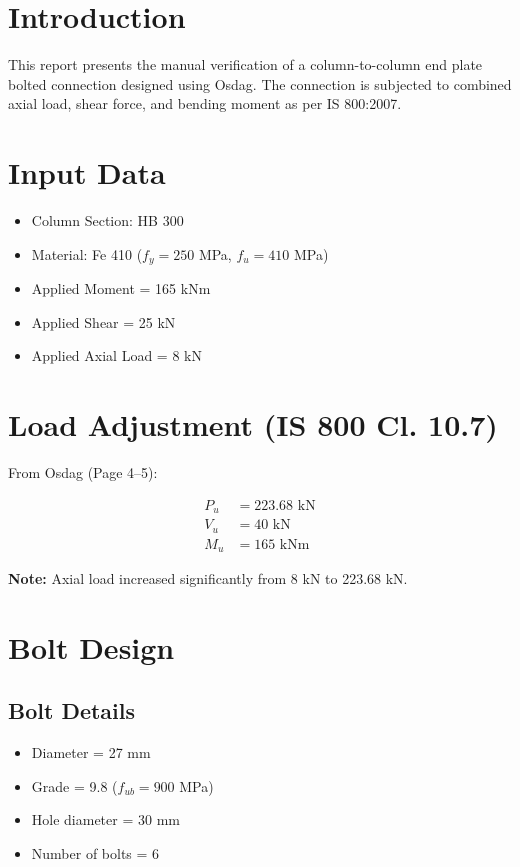 


\maketitle

\section{Introduction}
This report presents the manual verification of a column-to-column end plate bolted connection designed using Osdag. The connection is subjected to combined axial load, shear force, and bending moment as per IS 800:2007.

\section{Input Data}
\begin{itemize}
    \item Column Section: HB 300
    \item Material: Fe 410 ($f_y = 250$ MPa, $f_u = 410$ MPa)
    \item Applied Moment = 165 kNm
    \item Applied Shear = 25 kN
    \item Applied Axial Load = 8 kN
\end{itemize}

\section{Load Adjustment (IS 800 Cl. 10.7)}

From Osdag (Page 4–5):

\begin{align}
P_u &= 223.68 \text{ kN} \\
V_u &= 40 \text{ kN} \\
M_u &= 165 \text{ kNm}
\end{align}

\textbf{Note:} Axial load increased significantly from 8 kN to 223.68 kN.

\section{Bolt Design}

\subsection{Bolt Details}
\begin{itemize}
    \item Diameter = 27 mm
    \item Grade = 9.8 ($f_{ub} = 900$ MPa)
    \item Hole diameter = 30 mm
    \item Number of bolts = 6
\end{itemize}


